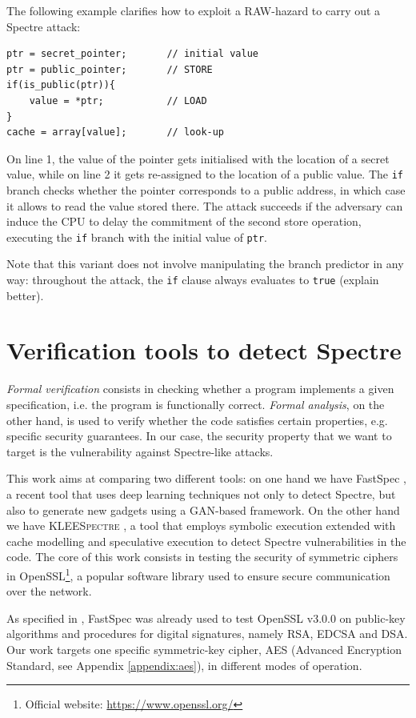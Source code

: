 \documentclass[12pt,a4paper]{book}
\theoremstyle{definition}
\begin{document}
	The following example clarifies how to exploit a RAW-hazard to carry out a Spectre attack:
	\begin{lstlisting}
ptr = secret_pointer;		// initial value
ptr = public_pointer;		// STORE
if(is_public(ptr)){	
	value = *ptr;			// LOAD
}
cache = array[value];		// look-up
	\end{lstlisting}
	On line 1, the value of the pointer gets initialised with the location of a secret value, while on line 2 it gets re-assigned to the location of a public value. The \texttt{if} branch checks whether the pointer corresponds to a public address, in which case it allows to read the value stored there. The attack succeeds if the adversary can induce the CPU to delay the commitment of the second store operation, executing the \texttt{if} branch with the initial value of \texttt{ptr}.
	
	Note that this variant does not involve manipulating the branch predictor in any way: throughout the attack, the \texttt{if} clause always evaluates to \texttt{true} (explain better).
	
	\chapter{Verification tools to detect Spectre}\label{chapter:verification}
	
	\textit{Formal verification} consists in checking whether a program implements a given specification, i.e. the program is functionally correct. \textit{Formal analysis}, on the other hand, is used to verify whether the code satisfies certain properties, e.g. specific security guarantees. In our case, the security property that we want to target is the vulnerability against Spectre-like attacks. 
	
	This work aims at comparing two different tools: on one hand we have FastSpec \cite{Tol2021}, a recent tool that uses deep learning techniques not only to detect Spectre, but also to generate new gadgets using a GAN-based framework. On the other hand we have \textsc{\textsc{KLEE}Spectre} \cite{Wang2020}, a tool that employs symbolic execution extended with cache modelling and speculative execution to detect Spectre vulnerabilities in the code. The core of this work consists in testing the security of symmetric ciphers in OpenSSL\footnote{Official website: \url{https://www.openssl.org/}}, a popular software library used to ensure secure communication over the network. 
	
	As specified in \cite{Tol2021}, FastSpec was already used to test OpenSSL v3.0.0 on public-key algorithms and procedures for digital signatures, namely RSA, EDCSA and DSA. Our work targets one specific symmetric-key cipher, AES (Advanced Encryption Standard, see Appendix \ref{appendix:aes}), in different modes of operation. 
	
\end{document}
